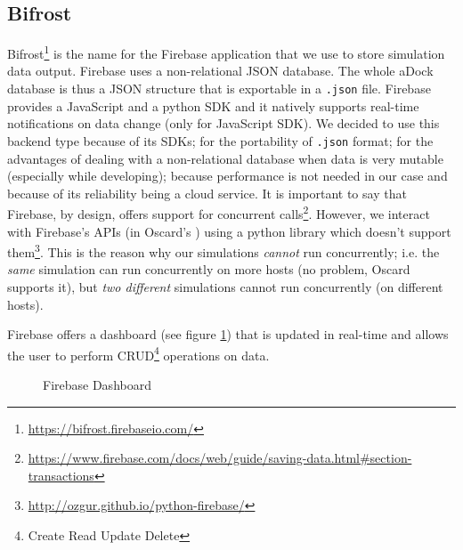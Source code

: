 \subsection{Bifrost}
\label{sub:bifrost}
Bifrost\footnote{\url{https://bifrost.firebaseio.com/}} is the name for the Firebase application that we use to store simulation data output. Firebase uses a non-relational JSON database. The whole aDock database is thus a JSON structure that is exportable in a \texttt{.json} file. Firebase provides a JavaScript and a python SDK and it natively supports real-time notifications on data change (only for JavaScript SDK). We decided to use this backend type because of its SDKs; for the portability of \texttt{.json} format; for the advantages of dealing with a non-relational database when data is very mutable (especially while developing); because performance is not needed in our case and because of its reliability being a cloud service. It is important to say that Firebase, by design, offers support for concurrent calls\footnote{\url{https://www.firebase.com/docs/web/guide/saving-data.html\#section-transactions}}. However, we interact with Firebase's APIs (in Oscard's ) using a python library which doesn't support them\footnote{\url{http://ozgur.github.io/python-firebase/}}. This is the reason why our simulations \emph{cannot} run concurrently; i.e. the \emph{same} simulation can run concurrently on more hosts (no problem, Oscard supports it), but \emph{two different} simulations cannot run concurrently (on different hosts).

Firebase offers a dashboard (see figure \ref{fig:firebase_dash}) that is updated in real-time and allows the user to perform CRUD\footnote{Create Read Update Delete} operations on data. 

\begin{figure}[H]
\label{fig:firebase_dash}
\caption{Firebase Dashboard}
\end{figure}

